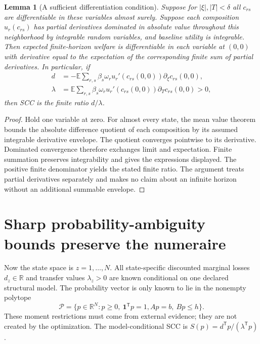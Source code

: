 \documentclass[11pt]{article}
\newtheorem{lemma}[theorem]{Lemma}
\newcommand{\E}{\mathbb E}
\newcommand{\R}{\mathbb R}
\begin{document}
\begin{lemma}[A sufficient differentiation condition]\label{diff}
Suppose for $|\xi|,|T|<\delta$ all $c_{rs}$ are differentiable in these
variables almost surely. Suppose each composition $u_r(c_{rs})$ has
partial derivatives dominated in absolute value throughout this
neighborhood by integrable random variables, and baseline utility is
integrable. Then expected finite-horizon welfare is differentiable in
each variable at $(0,0)$ with derivative equal to the expectation of the
corresponding finite sum of partial derivatives. In particular, if
\begin{align*}
 d&=-\E\sum_{r,s}\beta_s\omega_ru_r'(c_{rs}(0,0))
                              \partial_\xi c_{rs}(0,0),\\
 \lambda&=\E\sum_{r,s}\beta_s\omega_ru_r'(c_{rs}(0,0))
                              \partial_T c_{rs}(0,0)>0,
\end{align*}
then SCC is the finite ratio $d/\lambda$.
\end{lemma}
\begin{proof}
Hold one variable at zero. For almost every state, the mean value theorem
bounds the absolute difference quotient of each composition by its
assumed integrable derivative envelope. The quotient converges pointwise
to its derivative. Dominated convergence therefore exchanges limit and
expectation. Finite summation preserves integrability and gives the
expressions displayed. The positive finite denominator yields the stated
finite ratio. The argument treats partial derivatives separately and
makes no claim about an infinite horizon without an additional summable
envelope.
\end{proof}

\section{Sharp probability-ambiguity bounds preserve the numeraire}
Now the state space is $z=1,\ldots,N$. All state-specific discounted
marginal losses $d_z\in\R$ and transfer values $\lambda_z>0$ are known
conditional on one declared structural model. The probability vector is
only known to lie in the nonempty polytope
\[
 \mathcal P=\{p\in\R^N:p\geq0,\ \boldsymbol{1}^{\mathsf T}p=1,
                 Ap=b,\ Bp\leq h\}.                         \tag{1}
\]
These moment restrictions must come from external evidence; they are not
created by the optimization. The model-conditional SCC is
$S(p)=d^{\mathsf T}p/(\lambda^{\mathsf T}p)$.
\end{document}

